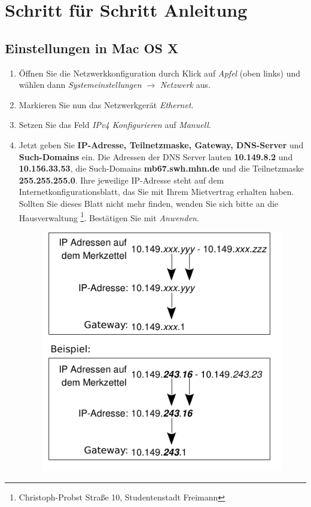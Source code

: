 \documentclass[a4paper,12pt]{scrartcl}
\begin{document}
\section*{Schritt für Schritt Anleitung}
\subsection*{Einstellungen in Mac OS X}
\begin{enumerate}
    \item Öffnen Sie die Netzwerkkonfiguration durch Klick auf \emph{Apfel} (oben links) und wählen dann \emph{Systemeinstellungen} $\rightarrow$ \emph{Netzwerk} aus.
    \item Markieren Sie nun das Netzwerkgerät \emph{Ethernet}.
    \item Setzen Sie das Feld \emph{IPv4 Konfigurieren} auf \emph{Manuell}.
	\item Jetzt geben Sie \textbf{IP-Adresse, Teilnetzmaske, Gateway, DNS-Server} und \textbf{Such-Domains} ein. Die Adressen der DNS Server lauten \textbf{10.149.8.2} und \textbf{10.156.33.53}, die Such-Domains \textbf{mb67.swh.mhn.de} und die Teilnetzmaske \textbf{255.255.255.0}. Ihre jeweilige IP-Adresse steht auf dem Internetkonfigurationsblatt, das Sie mit Ihrem Mietvertrag erhalten haben. Sollten Sie dieses Blatt nicht mehr finden, wenden Sie sich bitte an die Hausverwaltung \footnote{Christoph-Probst Straße 10, Studentenstadt Freimann}. Bestätigen Sie mit \emph{Anwenden}.
      \begin{figure}[h!]
      \centering
        \begin{minipage}[c]{0.38\linewidth}
          \centering
          \includegraphics[width=\linewidth,keepaspectratio]{Bilder/IP_Gerneric}

\end{minipage}
\end{figure}
\end{enumerate}
\end{document}
